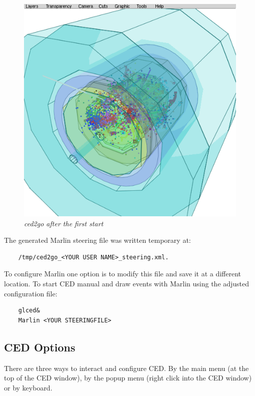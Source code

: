 \documentclass[a4paper,10pt]{article}
\begin{document}
\begin{figure}
    \begin{center}
         \includegraphics[width=0.5\linewidth]{img/quickstart.png}
         \caption{\label{CEDViewer} \textsl{ced2go after the first start}}
    \end{center}
\end{figure}

The generated Marlin steering file was written temporary at:
\begin{verbatim}
    /tmp/ced2go_<YOUR USER NAME>_steering.xml.  
\end{verbatim}
To configure Marlin one option is to modify this file and save it at a different location. 
To start CED manual and draw events with Marlin using the adjusted configuration file:
\begin{verbatim}
    glced&
    Marlin <YOUR STEERINGFILE>
\end{verbatim}






\subsection{CED Options}
There are three ways to interact and configure CED. 
By the main menu (at the top of the CED window), by the popup menu (right click into the CED window) or by keyboard.
\end{document}
